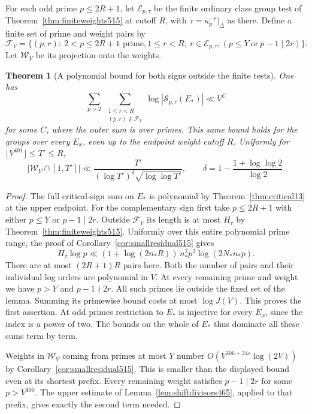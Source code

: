 \documentclass[a4paper,11pt]{article}
\newtheorem{theorem}[proposition]{Theorem}
\theoremstyle{definition}
\theoremstyle{remark}
\numberwithin{equation}{section}
\begin{document}
For each odd prime \(p\le 2R+1\), let \(\mathcal E_{p,\tau}\)
be the finite ordinary class group test of
Theorem~\ref{thm:finiteweights515} at cutoff \(R\), with
\(\tau=\kappa_p^{-r}|_\Delta\) as there. Define a finite set of
prime and weight pairs by
\[
 \mathcal F_V=\{(p,r):\ 2<p\le2R+1\text{ prime},   1\le r<R,\ r\in\mathcal E_{p,\tau},                   (p\le Y\ \text{or}\ p-1\mid 2r)\}.
\]
Let \(\mathcal W_V\) be its projection onto the weights.

\begin{theorem}[A polynomial bound for both signs outside the finite tests]
\leavevmode\label{thm:fullsparse517}
One has
\[
   \sum_{p>2}\ \sum_{\substack{1\le r<R\\(p,r)\notin\mathcal F_V}}
             \log |\mathcal S_{p,r}(E_*)| \ll V^C
\]
for some \(C\), where the outer sum is over primes. This same
bound holds for the groups over every \(E_x\), even up to the
endpoint weight cutoff \(R\). Uniformly for
\(\lfloor V^{401}\rfloor\le T'\le R\),
\[
 |\mathcal W_V\cap[1,T']|
    \ll \frac{T'}{(\log T')^\delta\sqrt{\log\log T'}},
 \qquad
 \delta=1-\frac{1+\log\log 2}{\log 2}.
\]
\end{theorem}
\begin{proof}
The full critical-sign sum on \(E_*\) is polynomial by
Theorem~\ref{thm:critical13} at the upper endpoint. For the
complementary sign first take \(p\le2R+1\) with either
\(p\le Y\) or \(p-1\mid2r\). Outside \(\mathcal F_V\) its length
is at most \(H_\tau\) by Theorem~\ref{thm:finiteweights515}.
Uniformly over this entire polynomial prime range, the proof
of Corollary~\ref{cor:smallresidual515} gives
\[
  H_\tau\log p\ll
   (1+\log(2n_*R))\,n_*^2 p^2\log(2N_*n_*p).
\]
There are at most \((2R+1)R\) pairs here. Both the number of
pairs and their individual log orders are polynomial in \(V\).
At every remaining prime and weight we have \(p>Y\) and
\(p-1\nmid 2r\). All such primes lie outside the fixed set of
the lemma. Summing its primewise bound costs at most \(\log J(V)\).
This proves the first assertion. At odd primes restriction to
\(E_*\) is injective for every \(E_x\), since the index is a
power of two. The bounds on the whole of \(E_*\) thus dominate
all these sums term by term.

Weights in \(\mathcal W_V\) coming from primes at most \(Y\)
number \(O(V^{306+24\varepsilon}\log(2V))\) by
Corollary~\ref{cor:smallresidual515}. This is smaller than the
displayed bound even at its shortest prefix. Every remaining
weight satisfies \(p-1\mid2r\) for some \(p>V^{100}\). The
upper estimate of Lemma~\ref{lem:shiftdivisors465}, applied
to that prefix, gives exactly the second term needed.
\end{proof}
\end{document}
